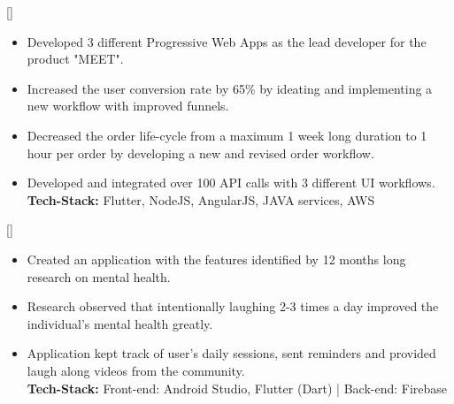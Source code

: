 \documentclass{article}
\begin{document}
[]
\begin{itemize}
    \item Developed 3 different Progressive Web Apps as the lead developer for the product "MEET".
    \item Increased the user conversion rate by 65\% by ideating and implementing a new workflow with improved funnels.
    \item Decreased the order life-cycle from a maximum 1 week long duration to 1 hour per order by developing a new and revised order workflow.
    \item Developed and integrated over 100 API calls with 3 different UI workflows.\\
\textbf{Tech-Stack:} Flutter, NodeJS, AngularJS, JAVA services, AWS 

\end{itemize}




[]
\begin{itemize}
    \item Created an application with the features identified by 12 months long research on mental health.
    \item Research observed that intentionally laughing 2-3 times a day improved the individual's mental health greatly.
    \item Application kept track of user's daily sessions, sent reminders and provided laugh along videos from the community.\\
\textbf{Tech-Stack:} 
Front-end: Android Studio, Flutter (Dart) | Back-end: Firebase
\end{itemize}
\end{document}

